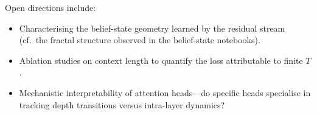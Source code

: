 \documentclass[11pt]{article}
\begin{document}
Open directions include:
\begin{itemize}
  \item Characterising the belief-state geometry learned by the residual
        stream (cf.\ the fractal structure observed in the belief-state
        notebooks).
  \item Ablation studies on context length to quantify the loss
        attributable to finite $T$.
  \item Mechanistic interpretability of attention heads---do specific
        heads specialise in tracking depth transitions versus intra-layer
        dynamics?
\end{itemize}
\end{document}
